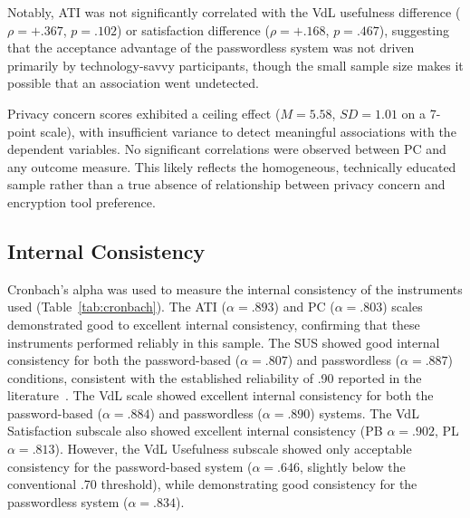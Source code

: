 Notably, ATI was not significantly correlated with the VdL usefulness difference ($\rho=+.367$, $p=.102$) or satisfaction difference ($\rho=+.168$, $p=.467$), suggesting that the acceptance advantage of the passwordless system was not driven primarily by technology-savvy participants, though the small sample size makes it possible that an association went undetected.

Privacy concern scores exhibited a ceiling effect ($M=5.58$, $SD=1.01$ on a 7-point scale), with insufficient variance to detect meaningful associations with the dependent variables. No significant correlations were observed between PC and any outcome measure. This likely reflects the homogeneous, technically educated sample rather than a true absence of relationship between privacy concern and encryption tool preference.


\subsection{Internal Consistency}
\label{sec:internal-consistency}

Cronbach's alpha was used to measure the internal consistency of the instruments used (Table~\ref{tab:cronbach}). The ATI ($\alpha = .893$) and PC ($\alpha = .803$) scales demonstrated good to excellent internal consistency, confirming that these instruments performed reliably in this sample. The SUS showed good internal consistency for both the password-based ($\alpha = .807$) and passwordless ($\alpha = .887$) conditions, consistent with the established reliability of .90 reported in the literature~\cite{lewis_item_2018}. The VdL scale showed excellent internal consistency for both the password-based ($\alpha = .884$) and passwordless ($\alpha = .890$) systems. The VdL Satisfaction subscale also showed excellent internal consistency (PB $\alpha = .902$, PL $\alpha = .813$). However, the VdL Usefulness subscale showed only acceptable consistency for the password-based system ($\alpha = .646$, slightly below the conventional .70 threshold), while demonstrating good consistency for the passwordless system ($\alpha = .834$).

